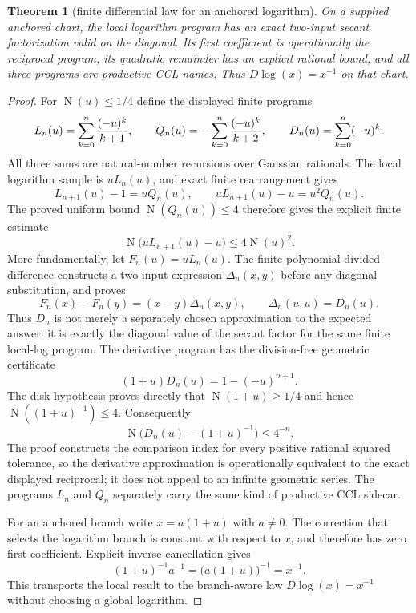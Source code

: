 \documentclass[10pt]{article}
\newtheorem{theorem}{Theorem}[section]
\theoremstyle{definition}
\theoremstyle{remark}
\newcommand{\Norm}{\operatorname{N}}
\begin{document}
\begin{theorem}[finite differential law for an anchored logarithm]
On a supplied anchored chart, the local logarithm program has an exact
two-input secant factorization valid on the diagonal.  Its first coefficient
is operationally the reciprocal program, its quadratic remainder has an
explicit rational bound, and all three programs are productive CCL names.
Thus $D\log(x)=x^{-1}$ on that chart.
\end{theorem}

\begin{proof}
For
$\Norm(u)\le1/4$ define the displayed finite programs
\[
 L_n(u)=\sum_{k=0}^n{(-u)^k\over k+1},
 \qquad
 Q_n(u)=-\sum_{k=0}^n{(-u)^k\over k+2},
 \qquad
 D_n(u)=\sum_{k=0}^n(-u)^k.
\]
All three sums are natural-number recursions over Gaussian rationals.  The
local logarithm sample is $uL_n(u)$, and exact finite rearrangement gives
\[
 L_{n+1}(u)-1=uQ_n(u),
 \qquad uL_{n+1}(u)-u=u^2Q_n(u).
 \tag{3.31q}
\]
The proved uniform bound $\Norm(Q_n(u))\le4$ therefore gives the explicit
finite estimate
\[
 \Norm\bigl(uL_{n+1}(u)-u\bigr)\le4\Norm(u)^2.
\]
More fundamentally, let $F_n(u)=uL_n(u)$.  The finite-polynomial divided
difference constructs a two-input expression $\Delta_n(x,y)$ before any
diagonal substitution, and proves
\[
 F_n(x)-F_n(y)=(x-y)\Delta_n(x,y),
 \qquad \Delta_n(u,u)=D_n(u).
\]
Thus $D_n$ is not merely a separately chosen approximation to the expected
answer: it is exactly the diagonal value of the secant factor for the same
finite local-log program.
The derivative program has the division-free geometric certificate
\[
 (1+u)D_n(u)=1-(-u)^{n+1}.
 \tag{3.31r}
\]
The disk hypothesis proves directly that
$\Norm(1+u)\ge1/4$ and hence
$\Norm((1+u)^{-1})\le4$.  Consequently
\[
 \Norm\bigl(D_n(u)-(1+u)^{-1}\bigr)\le4^{-n}.
 \tag{3.31s}
\]
The proof constructs the comparison index for every positive rational
squared tolerance, so the derivative approximation is operationally
equivalent to the exact displayed reciprocal; it does not appeal to an
infinite geometric series.  The programs $L_n$ and $Q_n$ separately carry
the same kind of productive CCL sidecar.

For an anchored branch write $x=a(1+u)$ with $a\ne0$.  The correction that
selects the logarithm branch is constant with respect to $x$, and therefore
has zero first coefficient.  Explicit inverse cancellation gives
\[
 (1+u)^{-1}a^{-1}=\bigl(a(1+u)\bigr)^{-1}=x^{-1}.
 \tag{3.31t}
\]
This transports the local result to the branch-aware law
$D\log(x)=x^{-1}$ without choosing a global logarithm.
\end{proof}
\end{document}
